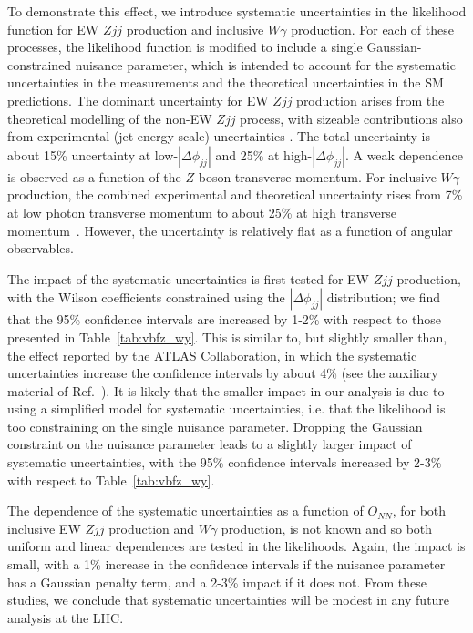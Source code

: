 \documentclass[twocolumn,preprintnumbers,superscriptaddress,nofootinbib,aps,prd,floatfix]{revtex4}
\begin{document}
To demonstrate this effect, we introduce systematic uncertainties in the likelihood function for EW $Zjj$ production and inclusive $W\gamma$ production. For each of these processes, the likelihood function is modified to include a single Gaussian-constrained nuisance parameter, which is intended to account for the systematic uncertainties in the measurements and the theoretical uncertainties in the SM predictions.
The dominant uncertainty for EW $Zjj$ production arises from the theoretical modelling of the non-EW $Zjj$ process, with sizeable contributions also from experimental (jet-energy-scale) uncertainties \cite{vbfzdata}. The total uncertainty is about 15\% uncertainty at low-$|\Delta\phi_{jj}|$ and 25\% at high-$|\Delta\phi_{jj}|$. A weak dependence is observed as a function of the $Z$-boson transverse momentum. For inclusive $W\gamma$ production, the combined experimental and theoretical uncertainty rises from 7\% at low photon transverse momentum to about 25\% at high transverse momentum~\cite{wydata}. However, the uncertainty is relatively flat as a function of angular observables.

The impact of the systematic uncertainties is first tested for EW $Zjj$ production, with the Wilson coefficients constrained using the $|\Delta\phi_{jj}|$ distribution; we find that the 95\% confidence intervals are increased by 1-2\% with respect to those presented in Table~\ref{tab:vbfz_wy}. This is similar to, but slightly smaller than, the effect reported by the ATLAS Collaboration, in which the systematic uncertainties increase the confidence intervals by about 4\% (see the auxiliary material of Ref.~\cite{ATLAS:2020nzk}). It is likely that the smaller impact in our analysis is due to using a simplified model for systematic uncertainties, i.e. that the likelihood is too constraining on the single nuisance parameter. Dropping the Gaussian constraint on the nuisance parameter leads to a slightly larger impact of systematic uncertainties, with the 95\% confidence intervals increased by 2-3\% with respect to Table~\ref{tab:vbfz_wy}. 

The dependence of the systematic uncertainties as a function of $O_{NN}$, for both inclusive EW $Zjj$ production and $W\gamma$ production, is not known and so both uniform and linear dependences are tested in the likelihoods. Again, the impact is small, with a 1\% increase in the confidence intervals if the nuisance parameter has a Gaussian penalty term, and a 2-3\% impact if it does not. From these studies, we conclude that systematic uncertainties will be modest in any future analysis at the LHC.
\end{document}
